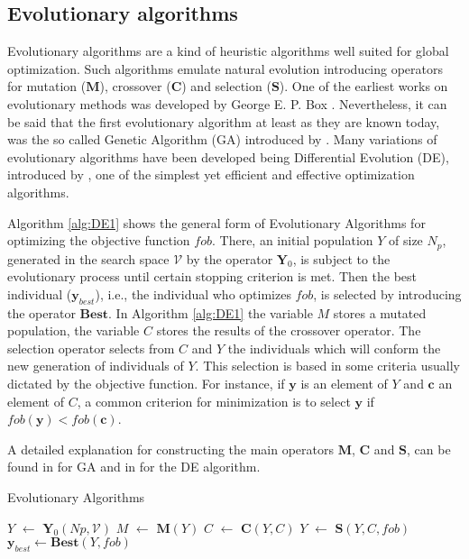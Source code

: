 \subsection{Evolutionary algorithms}
Evolutionary algorithms are a kind of heuristic algorithms well 
suited for global optimization. Such algorithms emulate natural
evolution introducing operators for mutation ($\mathbf{M}$), crossover 
($\mathbf{C}$) and selection ($\mathbf{S}$). One of the earliest works on
evolutionary methods was developed by George E. 
P. Box \cite{Box1957}. Nevertheless, it can be said that the first evolutionary 
algorithm at least as they are known today, was the so called Genetic Algorithm 
(GA) introduced by \citet{JHH1975}. Many variations of
evolutionary algorithms have been developed being Differential Evolution (DE),
introduced by \citet{Storn1997}, one of the simplest yet 
efficient and effective optimization algorithms. 

  Algorithm \ref{alg:DE1} shows 
the general form of Evolutionary Algorithms for optimizing the  
objective function $fob$. There, an initial population $Y$ of size $N_p$, 
generated in the search space $\mathcal{V}$ by the operator $\mathbf{Y}_0$,
is subject to the evolutionary process until certain stopping criterion is 
met. Then the best individual ($\mathbf{y}_{best}$), i.e., the individual who
optimizes $fob$, is selected by introducing the operator $\mathbf{Best}$. 
In Algorithm \ref{alg:DE1} the variable $M$ stores a mutated population, 
the variable $C$ stores the results of the crossover operator. The selection
operator selects from $C$ and $Y$ the individuals which will conform the new
generation of individuals of $Y$. This selection is based in some criteria 
usually dictated by the objective function. For instance, if $\mathbf{y}$ is an 
element of $Y$ and $\mathbf{c}$ an element of $C$, a common criterion for 
minimization is to select $\mathbf{y}$ if $fob(\mathbf{y})<fob(\mathbf{c})$.

  A detailed explanation for constructing the main operators 
$\mathbf{M}$, $\mathbf{C}$ and $\mathbf{S}$, can be found in
\cite{Bagchi1999} for GA and in \cite{Price_Storn2005} for the DE
algorithm.
%
\begin{algorithm}[htb]
  \caption{Evolutionary Algorithms}
  \label{alg:DE1}
  \begin{algorithmic}
    \State $Y$ $\leftarrow$ $\mathbf{Y}_0(Np,\mathcal{V})$
    \State $M$ $\leftarrow$  $\mathbf{M}(Y)$
    \State $C$ $\leftarrow$  $\mathbf{C}(Y,C)$
    \State $Y$ $\leftarrow$  $\mathbf{S}(Y,C,fob)$ 
    \EndWhile
    \State $\mathbf{y}_{best} \leftarrow \mathbf{Best}(Y, fob)$
  \end{algorithmic}
\end{algorithm}%

